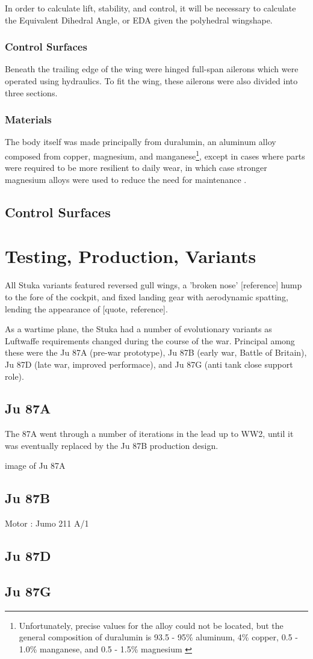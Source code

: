 \documentclass[a4paper, fontsize=11pt]{scrartcl} %
\begin{document}
In order to calculate lift, stability, and control, it will be necessary to
calculate the Equivalent Dihedral Angle, or EDA given the polyhedral
wingshape. 

\subsubsection{Control Surfaces}
Beneath the trailing edge of the wing were hinged full-span
ailerons which were operated using hydraulics. To fit the wing, these
ailerons were also divided into three sections.

\subsubsection{Materials}

The body itself was made principally from
duralumin, an aluminum alloy composed from copper, magnesium, and
manganese\footnote{Unfortunately, precise values for the alloy could not
  be located, but the general composition of duralumin is 93.5 - 95\% aluminum, 4\%
  copper, 0.5 - 1.0\% manganese, and 0.5 - 1.5\%
  magnesium \autocite[p.~102-103]{wardlaw33}},
  except in cases where parts were required to be more resilient to daily
  wear, in which case stronger magnesium alloys were used to reduce the
  need for maintenance \autocite[p.~15]{guardia14}.

  \subsection{Control Surfaces}

  \section{Testing, Production, Variants}
  All Stuka variants featured reversed gull wings, a 'broken nose' [reference]
  hump to the fore of the cockpit, and fixed landing gear with aerodynamic
  spatting\autocite[p.~4]{curry88}, lending the
  appearance of [quote, reference]. %

  As a wartime plane, the Stuka had a number of evolutionary variants as
  Luftwaffe requirements changed during the course of the war. Principal among these were the Ju 87A
  (pre-war prototype), Ju 87B (early war, Battle of Britain), Ju 87D
  (late war, improved performace), and Ju 87G (anti tank close support
  role).
  \subsection{Ju 87A}
  The 87A went through a number of iterations in the lead up to WW2,
  until it was eventually replaced by the Ju 87B production design.

  {image of Ju 87A}
  \subsection{Ju 87B}
  Motor : Jumo 211 A/1
  \subsection{Ju 87D}
  \subsection{Ju 87G}
  \printbibliography
  
\end{document}
